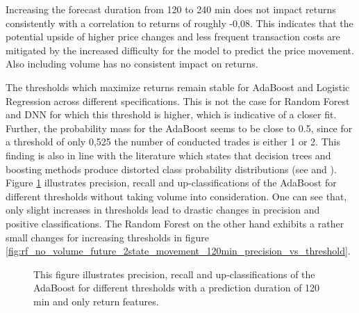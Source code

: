 Increasing the forecast duration from 120 to 240 min does not impact returns consistently with a correlation to returns of roughly -0,08. 
This indicates that the potential upside of higher price changes and less frequent transaction costs are mitigated 
by the increased difficulty for the model to predict the price movement. 
Also including volume has no consistent impact on returns.

The thresholds which maximize returns remain stable for AdaBoost and Logistic Regression across different specifications.
This is not the case for Random Forest and DNN for which this threshold is higher, which is indicative of a closer fit.
Further, the probability mass for the AdaBoost seems to be close to 0.5, 
since for a threshold of only 0,525 the number of conducted trades is either 1 or 2. This finding is also in line with the literature 
which states that decision trees and boosting methods produce distorted class probability distributions
(see \cite{caruana2005probabilityDistortion} and \cite{zadrozny2005calibratedProbabilties}).
Figure \ref{fig:adaboost_no_volume_future_2state_movement_120min_precision_vs_threshold} illustrates precision, recall and up-classifications of the AdaBoost for different thresholds
without taking volume into consideration. One can see that, only slight increases in thresholds 
lead to drastic changes in precision and positive classifications. The Random Forest
on the other hand exhibits a rather small changes for increasing thresholds in figure \ref{fig:rf_no_volume_future_2state_movement_120min_precision_vs_threshold}.

\begin{figure}[H]
    \captionsetup{format=plain}
    \caption{ 
            This figure illustrates precision, recall and up-classifications of the AdaBoost for different thresholds
            with a prediction duration of 120 min and only return features.
        }
    \label{fig:adaboost_no_volume_future_2state_movement_120min_precision_vs_threshold}
\end{figure}

